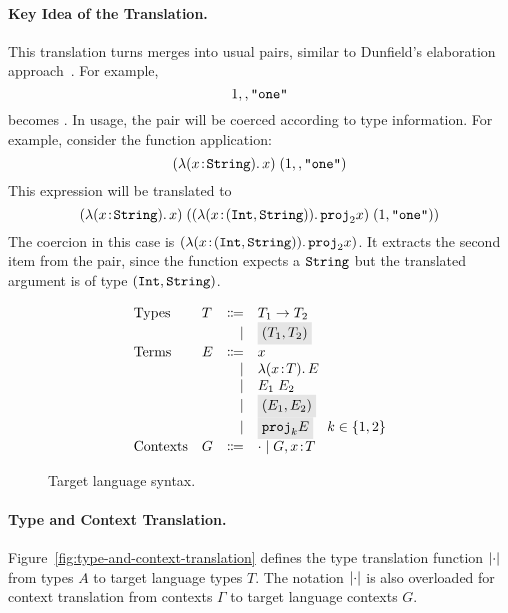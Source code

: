 \paragraph{Key Idea of the Translation.}
This translation turns merges into usual pairs, similar to Dunfield's
elaboration approach~\cite{dunfield2014elaborating}.
For example, \[ 1 ,, \texttt{"one"} \] becomes 
{}. In usage, the pair will be coerced according to type
information. For example, consider the function application: \[ (\lambda (x \!:\! \texttt{String}).\, x) \; (1 ,, \texttt{"one"}) \] This expression will be translated to \[ (\lambda (x \!:\! \texttt{String}).\, x) \; ((\lambda (x \!:\! (\texttt{Int}, \texttt{String})).\, {\texttt{proj}}_{2} x) \; (1, \texttt{"one"})) \] The coercion in this case is $(\lambda (x \!:\! (\texttt{Int}, \texttt{String})).\, {\texttt{proj}}_{2} x)$. It extracts the second item from the pair, since
the function expects a $\texttt{String}$ but the translated argument is of type $(\texttt{Int}, \texttt{String})$.


\begin{figure}[h]
  \[
    \begin{array}{llrl}
      \text{Types}    & T & \Coloneqq & {T_1} \to {T_2} \\
                      &   & \mid      & \highlight {$ \pair {T_1} {T_2} $} \\
      \text{Terms}    & E & \Coloneqq & x \\
                      &   & \mid      & \lamty x T E \\
                      &   & \mid      & \app {E_1} {E_2} \\
                      &   & \mid      & \highlight {$ \pair {E_1} {E_2} $} \\
                      &   & \mid      & \highlight {$ \proj k E $} \quad k \in \{ 1, 2 \} \\
      \text{Contexts} & G & \Coloneqq & \cdot \mid G, x \oftype T \\
    \end{array}
  \]
  \caption{Target language syntax.}
  \label{fig:f-syntax}
\end{figure}

\paragraph{Type and Context Translation.}

Figure~\ref{fig:type-and-context-translation} defines the type translation
function $\lvert \cdot \rvert$ from \name types $A$ to target language types $T$. The
notation $\lvert \cdot \rvert$ is also overloaded for context translation from \name
contexts $\Gamma$ to target language contexts $G$.

